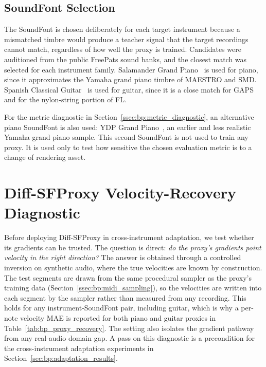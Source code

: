 \subsection{SoundFont Selection}
\label{ssec:bp:soundfonts}

The SoundFont is chosen deliberately for each target instrument because a mismatched timbre would produce a teacher signal that the target recordings cannot match, regardless of how well the proxy is trained. Candidates were auditioned from the public FreePats sound banks, and the closest match was selected for each instrument family. Salamander Grand Piano~\cite{sf_salamander} is used for piano, since it approximates the Yamaha grand piano timbre of MAESTRO and SMD. Spanish Classical Guitar~\cite{sf_spanishguitar} is used for guitar, since it is a close match for GAPS and for the nylon-string portion of FL.

For the metric diagnostic in Section~\ref{ssec:bp:metric_diagnostic}, an alternative piano SoundFont is also used: YDP Grand Piano~\cite{sf_ydpgrand}, an earlier and less realistic Yamaha grand piano sample. This second SoundFont is not used to train any proxy. It is used only to test how sensitive the chosen evaluation metric is to a change of rendering asset.

\section{Diff-SFProxy Velocity-Recovery Diagnostic}
\label{sec:bp:proxy_diagnostic}

Before deploying Diff-SFProxy in cross-instrument adaptation, we test whether its gradients can be trusted. The question is direct: \emph{do the proxy's gradients point velocity in the right direction?} The answer is obtained through a controlled inversion on synthetic audio, where the true velocities are known by construction. The test segments are drawn from the same procedural sampler as the proxy's training data (Section~\ref{ssec:bp:midi_sampling}), so the velocities are written into each segment by the sampler rather than measured from any recording. This holds for any instrument-SoundFont pair, including guitar, which is why a per-note velocity MAE is reported for both piano and guitar proxies in Table~\ref{tab:bp_proxy_recovery}. The setting also isolates the gradient pathway from any real-audio domain gap. A pass on this diagnostic is a precondition for the cross-instrument adaptation experiments in Section~\ref{sec:bp:adaptation_results}.

